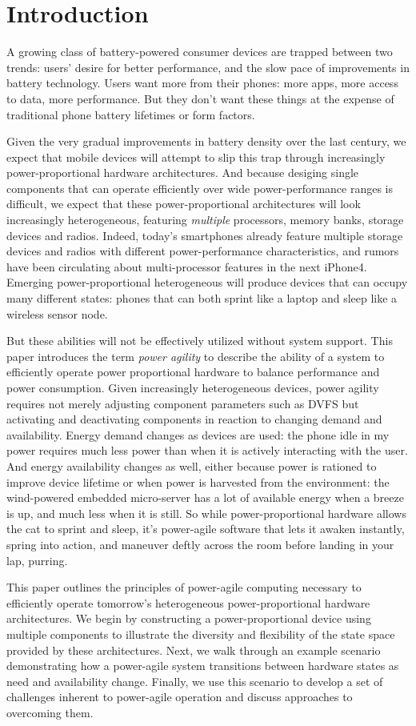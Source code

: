 \section{Introduction}

A growing class of battery-powered consumer devices are trapped between two
trends: users' desire for better performance, and the slow pace of
improvements in battery technology. Users want more from their phones: more
apps, more access to data, more performance. But they don't want these things
at the expense of traditional phone battery lifetimes or form factors.

Given the very gradual improvements in battery density over the last century,
we expect that mobile devices will attempt to slip this trap through
increasingly power-proportional hardware architectures. And because desiging
single components that can operate efficiently over wide power-performance
ranges is difficult, we expect that these power-proportional architectures
will look increasingly heterogeneous, featuring \textit{multiple} processors,
memory banks, storage devices and radios. Indeed, today's smartphones already
feature multiple storage devices and radios with different power-performance
characteristics, and rumors have been circulating about multi-processor
features in the next iPhone4. Emerging power-proportional heterogeneous will
produce devices that can occupy many different states: phones that can both
sprint like a laptop and sleep like a wireless sensor node.

But these abilities will not be effectively utilized without system support.
This paper introduces the term \textit{power agility} to describe the ability
of a system to efficiently operate power proportional hardware to balance
performance and power consumption. Given increasingly heterogeneous devices,
power agility requires not merely adjusting component parameters such as DVFS
but activating and deactivating components in reaction to changing demand and
availability. Energy demand changes as devices are used: the phone idle in my
power requires much less power than when it is actively interacting with the
user. And energy availability changes as well, either because power is
rationed to improve device lifetime or when power is harvested from the
environment: the wind-powered embedded micro-server has a lot of available
energy when a breeze is up, and much less when it is still. So while
power-proportional hardware allows the cat to sprint and sleep, it's
power-agile software that lets it awaken instantly, spring into action, and
maneuver deftly across the room before landing in your lap, purring.

This paper outlines the principles of power-agile computing necessary to
efficiently operate tomorrow's heterogeneous power-proportional hardware
architectures. We begin by constructing a power-proportional device using
multiple components to illustrate the diversity and flexibility of the state
space provided by these architectures. Next, we walk through an example
scenario demonstrating how a power-agile system transitions between hardware
states as need and availability change. Finally, we use this scenario to
develop a set of challenges inherent to power-agile operation and discuss
approaches to overcoming them.
